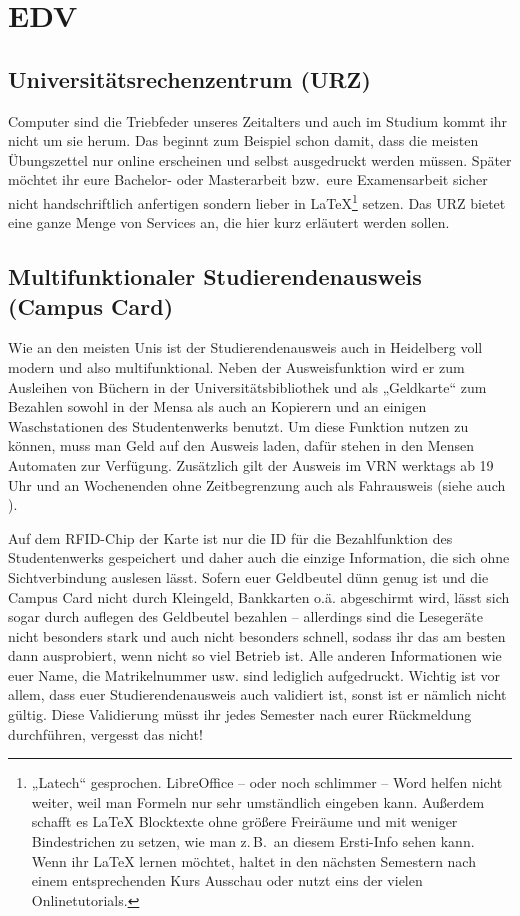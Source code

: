\section{EDV}

\subsection{Universitätsrechenzentrum (URZ)}
\label{urz}
Computer sind die Triebfeder unseres Zeitalters und auch im Studium kommt ihr nicht um sie herum. Das beginnt zum Beispiel schon damit, dass die meisten Übungszettel nur online erscheinen und selbst ausgedruckt werden müssen. Später möchtet ihr eure Bachelor- oder Masterarbeit bzw.\ eure Examensarbeit sicher nicht handschriftlich anfertigen sondern lieber in \LaTeX \footnote{„Latech“ gesprochen. LibreOffice -- oder noch schlimmer -- Word helfen nicht weiter, weil man Formeln nur sehr umständlich eingeben kann. Außerdem schafft es \LaTeX{} Blocktexte ohne größere Freiräume und mit weniger Bindestrichen zu setzen, wie man z.\,B.\ an diesem Ersti-Info sehen kann. Wenn ihr \LaTeX{} lernen möchtet, haltet in den nächsten Semestern nach einem entsprechenden Kurs Ausschau oder nutzt eins der vielen Onlinetutorials.} setzen. Das \gls{URZ} bietet eine ganze Menge von Services an, die hier kurz erläutert werden sollen.

\subsection*{Multifunktionaler Studierendenausweis (Campus Card)}
\label{campuscard}
Wie an den meisten Unis ist der Studierendenausweis auch in Heidelberg voll modern und also multifunktional. Neben der Ausweisfunktion wird er zum Ausleihen von Büchern in der Universitätsbibliothek und als „Geldkarte“ zum Bezahlen sowohl in der Mensa als auch an Kopierern und an einigen Waschstationen des Studentenwerks benutzt. Um diese Funktion nutzen zu können, muss man Geld auf den Ausweis laden, dafür stehen in den Mensen Automaten zur Verfügung. Zusätzlich gilt der Ausweis im \gls{VRN} werktags ab 19 Uhr und an Wochenenden ohne Zeitbegrenzung auch als Fahrausweis (siehe auch ).

Auf dem RFID-Chip der Karte ist nur die ID für die Bezahlfunktion des Studentenwerks gespeichert und daher auch die einzige Information, die sich ohne Sichtverbindung auslesen lässt. Sofern euer Geldbeutel dünn genug ist und die Campus Card nicht durch Kleingeld, Bankkarten o.ä. abgeschirmt wird, lässt sich sogar durch auflegen des Geldbeutel bezahlen -- allerdings sind die Lesegeräte nicht besonders stark und auch nicht besonders schnell, sodass ihr das am besten dann ausprobiert, wenn nicht so viel Betrieb ist. Alle anderen Informationen wie euer Name, die Matrikelnummer usw. sind lediglich aufgedruckt. Wichtig ist vor allem, dass euer Studierendenausweis auch validiert ist, sonst ist er nämlich nicht gültig. Diese Validierung müsst ihr jedes Semester nach eurer Rückmeldung durchführen, vergesst das nicht!

